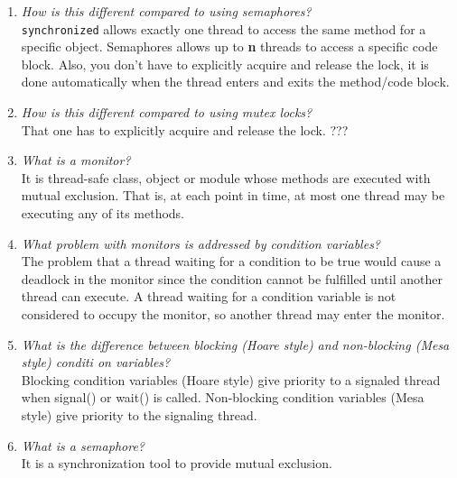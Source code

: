 \documentclass[a4paper]{article}
\begin{document}
\begin{enumerate}
  \item \textit{ How is this different compared to using semaphores? }\\

    \texttt{synchronized} allows exactly one thread to access the same method for a specific object. Semaphores allows up to \textbf{n} threads to access a specific code block. Also, you don't have to explicitly acquire and release the lock, it is done automatically when the thread enters and exits the method/code block.

  \item \textit{ How is this different compared to using mutex locks? }\\

    That one has to explicitly acquire and release the lock. {\color{red}???}

  \item \textit{ What is a monitor? }\\

    It is thread-safe class, object or module whose methods are executed with mutual exclusion. That is, at each point in time, at most one thread may be executing any of its methods.

  \item \textit{ What problem with monitors is addressed by condition variables? }\\

    The problem that a thread waiting for a condition to be true would cause a deadlock in the monitor since the condition cannot be fulfilled until another thread can execute. A thread waiting for a condition variable is not considered to occupy the monitor, so another thread may enter the monitor.

  \item \textit{ What is the difference between blocking (Hoare style) and non-blocking (Mesa style) conditi
on variables? }\\

    Blocking condition variables (Hoare style) give priority to a signaled thread when signal() or wait() is called. Non-blocking condition variables (Mesa style) give priority to the signaling thread.

  \item \textit{ What is a semaphore? }\\

    It is a synchronization tool to provide mutual exclusion.
\end{enumerate}
\end{document}

